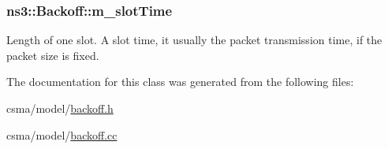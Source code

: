 \subsubsection[{\texorpdfstring{m\+\_\+slot\+Time}{m_slotTime}}]{ ns3\+::\+Backoff\+::m\+\_\+slot\+Time}\hypertarget{classns3_1_1Backoff_ae6a94d4f007f1cac661b2dc6cf84be0f}{}\label{classns3_1_1Backoff_ae6a94d4f007f1cac661b2dc6cf84be0f}
Length of one slot. A slot time, it usually the packet transmission time, if the packet size is fixed. 

The documentation for this class was generated from the following files\+:\begin{DoxyCompactItemize}
\item 
csma/model/\hyperlink{backoff_8h}{backoff.\+h}\item 
csma/model/\hyperlink{backoff_8cc}{backoff.\+cc}\end{DoxyCompactItemize}
